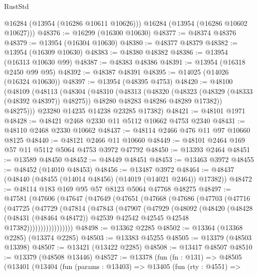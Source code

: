\begin{lexlean}{RustStd}
\begin{coremodule}
        @16284
        (@13954 (@16286 @10611 @10626)))
      @16284
      (@13954 (@16286 @10602 @10627)))
@48376 := @16299 (@16300 @10630)
@48377 := @48374 @48376
@48379 := @13954 (@16304 @10630)
@48380 := @48377 @48379
@48382 := @13954 (@16309 @10630)
@48383 := @48380 @48382
@48386 := @13954 (@16313 @10630 @99)
@48387 := @48383 @48386
@48391 := @13954 (@16318 @2450 @99 @95)
@48392 := @48387 @48391
@48395 := @14025 (@14026 (@16324 @10630))
@48397 := @13954 (@48395 @4753)
@48420 := @48100
    (@48109
      (@48113
        (@48304
          (@48310
            (@48313
              (@48320
                (@48323 (@48329 (@48333 (@48392 @48397)) @48275))
                @48280
                @48283
                @48286
                @48289
                @17382))
            @48275)))
      @23280
      @14235
      @14238
      @23285
      @17382)
@48421 := @48101 @1971
@48428 := @48421 @2468 @2330 @11 @5112 @10662 @4753 @2340
@48431 := @48110 @2468 @2330 @10662
@48437 := @48114 @2466 @476 @11 @97 @10660 @8125
@48440 := @48121 @2466 @11 @10660
@48449 := @48101 @2464 @169 @57 @11 @5112 @5064 @4753 @3972 @47792
@48450 := @13393 @2464
@48451 := @13589 @48450
@48452 := @48449 @48451
@48453 := @13463 @3972
@48455 := @48452 (@14010 @48453)
@48456 := @13487 @3972
@48464 := @48437 (@48440 (@48455 (@14014 @48456) (@14019 (@14021 @2464)) @17382))
@48472 := @48114 @183 @169 @95 @57 @8123 @5064 @47768 @48275
@48497 := @47581
    (@47606
      (@47647
        (@47649
          (@47651
            (@47668
              (@47686
                (@47703
                  (@47716
                    (@47725
                      (@47729
                        (@47814
                          (@47843
                            (@47907
                              (@47929
                                (@48092
                                  (@48420
                                    (@48428
                                      (@48431 (@48464 @48472))
                                      @42539
                                      @42542
                                      @42545
                                      @42548
                                      @17382)))))))))))))))))
@48498 := @13362 @2285
@48502 := @13364 (@13368 @2285) (@13374 @2285)
@48503 := @13383 @45255
@48505 := @13379 (@48503 @13398)
@48507 := @13421 (@13422 @2285)
@48508 := @13417 @48507
@48510 := @13379 (@48508 @13446)
@48527 := @13378
    (fun (fn : @131) =>
    @48505
      (@13401
        (@13404
          (fun (params : @13403) =>
          @13405
            (fun (rty : @4551) =>

\end{coremodule}
\end{lexlean}
